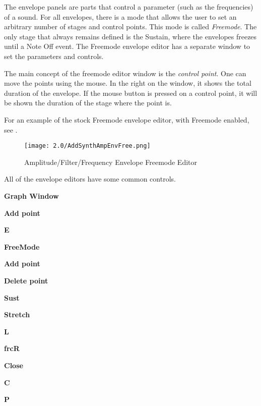    The envelope panels are parts that control a parameter (such as the
   frequencies) of a sound.  For all envelopes, there is a mode that allows the
   user to set an arbitrary number of stages and control points. This mode is
   called \textsl{Freemode}.  The only stage that always remains defined is the
   Sustain, where the envelopes freezes until a Note Off event.  The Freemode
   envelope editor has a separate window to set the parameters and controls.

   The main concept of the freemode editor window is the
   \textsl{control point}.
   One can move the points using the mouse. In the right on the
   window, it shows the total duration of the envelope. If the mouse button
   is pressed on a control point, it will be shown the duration of the
   stage where the point is.

   For an example of the stock Freemode envelope editor, with
   Freemode enabled, see .

\begin{figure}[H]
   \centering
   \texttt{[image: 2.0/AddSynthAmpEnvFree.png]}
   \caption{Amplitude/Filter/Frequency Envelope Freemode Editor}
   \label{fig:amplitude_envelope_freemode}
\end{figure}

   All of the envelope editors have some common controls.

   \begin{enumber}
      \item \textbf{Graph Window}
      \item \textbf{Add point}
      \item \textbf{E}
      \item \textbf{FreeMode}
      \item \textbf{Add point}
      \item \textbf{Delete point}
      \item \textbf{Sust}
      \item \textbf{Stretch}
      \item \textbf{L}
      \item \textbf{frcR}
      \item \textbf{Close}
      \item \textbf{C}
      \item \textbf{P}
   \end{enumber}

   \setcounter{ItemCounter}{0}      %

